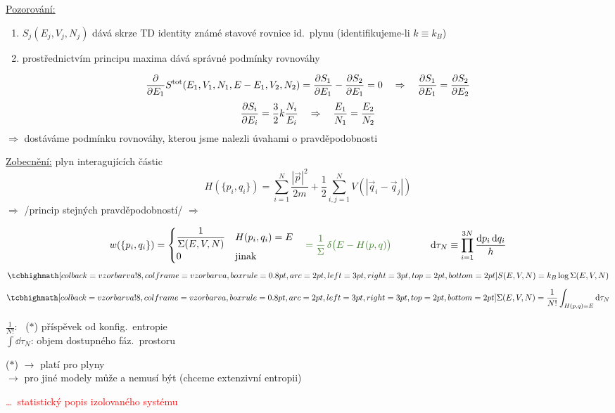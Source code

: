\underline{Pozorování:}
\begin{enumerate}[label=\arabic*)]
  \item $S_j(E_j,V_j,N_j)$ dává skrze TD identity známé stavové rovnice id.\ plynu (identifikujeme-li $k\equiv k_B$)
  \item prostřednictvím principu maxima dává správné podmínky rovnováhy
\end{enumerate}
\begin{priklad}
\[
  \pdv{E_1}S^{\mathrm{tot}}(E_1,V_1,N_1,E - E_1,V_2,N_2) = \pdv{S_1}{E_1} - \pdv{S_2}{E_1} = 0
  \quad\Rightarrow\quad \pdv{S_1}{E_1} = \pdv{S_2}{E_2}
\]
\[
  \pdv{S_i}{E_i} = \frac32k\frac{N_i}{E_i} \quad\Rightarrow\quad \frac{E_1}{N_1} = \frac{E_2}{N_2}
\]
$\Rightarrow$ dostáváme podmínku rovnováhy, kterou jsme nalezli úvahami o pravděpodobnosti
\end{priklad}

\underline{Zobecnění:} plyn interagujících částic
\[
  H(\{p_i,q_i\}) = \sum_{i=1}^{N}\frac{|\vec p|^2}{2m} + \frac12\sum_{i,j=1}^{N}V(|\vec q_i - \vec q_j|)
\]
$\Rightarrow$ /princip stejných pravděpodobností/ $\Rightarrow$

\begin{tcolorbox}[enhanced,colback=Red!3,colframe=Red,boxrule=0.8pt,arc=2pt,
  fonttitle=\bfseries\small,coltitle=white,title={Mikrokanonický soubor}]
\[
  w(\{p_i,q_i\}) = \begin{cases} \dfrac{1}{\Sigma(E,V,N)} & H(p_i,q_i) = E \\[4pt] 0 & \text{jinak} \end{cases}
  \quad \textcolor{OliveGreen}{= \frac1\Sigma\,\delta\big(E - H(p,q)\big)}
  \qquad\qquad \dd\tau_N \equiv \prod_{i=1}^{3N}\frac{\dd p_i\,\dd q_i}{h}
\]
\[
  \vzorec{S(E,V,N) = k_B\log\Sigma(E,V,N)}
\]
\[
  \vzorec{\Sigma(E,V,N) = \frac{1}{N!}\int_{H(p,q)=E}\dd\tau_N}
\]
\begin{minipage}[t]{0.5\textwidth}
\color{NavyBlue}\small
$\frac{1}{N!}$: \ ($*$) příspěvek od konfig.\ entropie \\
$\int\dd\tau_N$: objem dostupného fáz.\ prostoru
\end{minipage}
\begin{minipage}[t]{0.48\textwidth}
\color{OliveGreen}\small
($*$) $\to$ platí pro plyny \\
$\to$ pro jiné modely může a nemusí být (chceme extenzivní entropii)
\end{minipage}
\end{tcolorbox}
\textcolor{Red}{ \dots\ statistický popis izolovaného systému}

